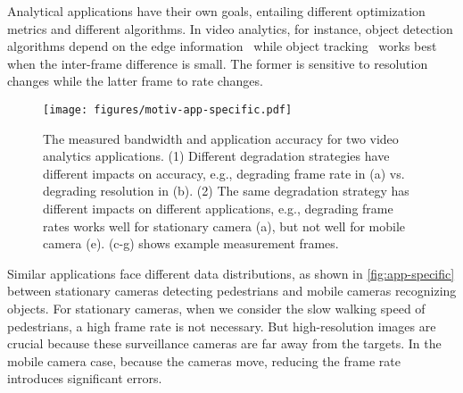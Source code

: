 Analytical applications have their own goals, entailing different optimization
metrics and different algorithms. In video analytics, for instance, object
detection algorithms depend on the edge
information~\cite{canny1986computational, lowe2004distinctive, viola2001rapid}
while object tracking~\cite{allen2004object} works best when the inter-frame
difference is small. The former is sensitive to resolution changes while the
latter frame to rate changes.

\begin{figure*}
  \centering
  \texttt{[image: figures/motiv-app-specific.pdf]}
  \caption{The measured bandwidth and application accuracy for two video
    analytics applications.  (1) Different degradation strategies have different
    impacts on accuracy, e.g., degrading frame rate in (a) vs.\,degrading
    resolution in (b).  (2) The same degradation strategy has different impacts
    on different applications, e.g., degrading frame rates works well for
    stationary camera (a), but not well for mobile camera (e). (c-g) shows
    example measurement frames. }
  \label{fig:app-specific}
\end{figure*}

Similar applications face different data distributions, as shown in
\autoref{fig:app-specific} between stationary cameras detecting pedestrians and
mobile cameras recognizing objects. For stationary cameras, when we consider the
slow walking speed of pedestrians, a high frame rate is not necessary. But
high-resolution images are crucial because these surveillance cameras are far
away from the targets. In the mobile camera case, because the cameras move,
reducing the frame rate introduces significant errors.

